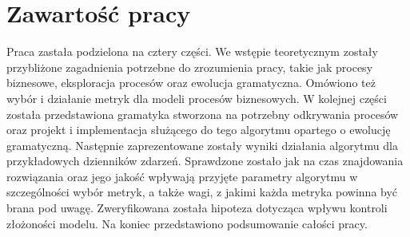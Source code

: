 \section{Zawartość pracy}
\label{sec:zawartoscPracy}

Praca zastała podzielona na cztery części. We wstępie teoretycznym zostały przybliżone zagadnienia potrzebne do zrozumienia pracy, takie jak procesy biznesowe, eksploracja procesów oraz ewolucja gramatyczna. Omówiono też wybór i działanie metryk dla modeli procesów biznesowych. W kolejnej części została przedstawiona gramatyka stworzona na potrzebny odkrywania procesów oraz projekt i implementacja służącego do tego algorytmu opartego o ewolucję gramatyczną. Następnie zaprezentowane zostały wyniki działania algorytmu dla przykładowych dzienników zdarzeń. Sprawdzone zostało jak na czas znajdowania rozwiązania oraz jego jakość wpływają przyjęte parametry algorytmu w szczególności wybór metryk, a także wagi, z jakimi każda metryka powinna być brana pod uwagę. Zweryfikowana została hipoteza dotycząca wpływu kontroli złożoności modelu. Na koniec przedstawiono podsumowanie całości pracy. 
